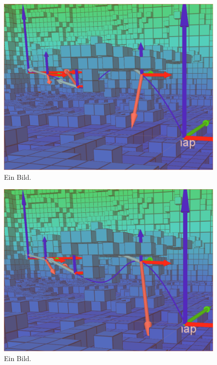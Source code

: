 \begin{figure}[h]
   \centering
   \includegraphics[width=1\textwidth]{pics/Vertex_in_middle_2.png}
   \caption{Ein Bild.}
\end{figure}

\begin{figure}[h]
   \centering
   \includegraphics[width=1\textwidth]{pics/section.png}
   \caption{Ein Bild.}
\end{figure}



